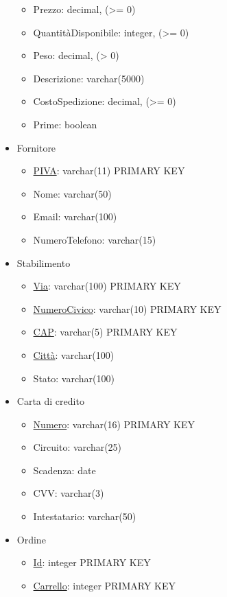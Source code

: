 \documentclass[11pt]{article}
\begin{document}
\begin{itemize}
\begin{itemize}
        \item Prezzo: decimal, (\textgreater{}= 0)
        \item QuantitàDisponibile: integer, (\textgreater{}= 0)
        \item Peso: decimal, (\textgreater{} 0)
        \item Descrizione: varchar(5000)
        \item CostoSpedizione: decimal, (\textgreater{}= 0)
        \item Prime: boolean
    \end{itemize}
    \item Fornitore
    \begin{itemize}
        \item \underline{PIVA}: varchar(11) PRIMARY KEY
        \item Nome: varchar(50)
        \item Email: varchar(100)
        \item NumeroTelefono: varchar(15)
    \end{itemize}
    \item Stabilimento
    \begin{itemize}
        \item \underline{Via}: varchar(100) PRIMARY KEY
        \item \underline{NumeroCivico}: varchar(10) PRIMARY KEY
        \item \underline{CAP}: varchar(5) PRIMARY KEY
        \item \underline{Città}: varchar(100)
        \item Stato: varchar(100)
    \end{itemize}
    \item Carta di credito
    \begin{itemize}
        \item \underline{Numero}: varchar(16) PRIMARY KEY
        \item Circuito: varchar(25)
        \item Scadenza: date
        \item CVV: varchar(3)
        \item Intestatario: varchar(50)
    \end{itemize}
    \item Ordine
    \begin{itemize}
        \item \underline{Id}: integer PRIMARY KEY
        \item \underline{Carrello}: integer PRIMARY KEY

\end{itemize}
\end{itemize}
\end{document}
